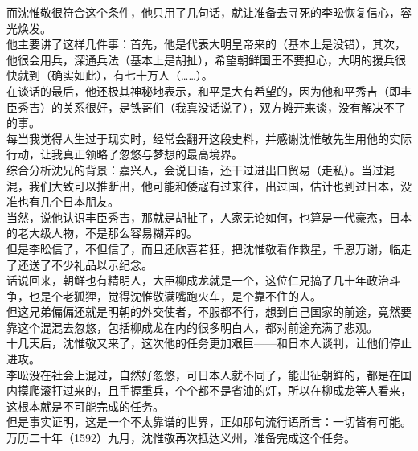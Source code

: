 \begin{multicols}{\theparacolNo}
而沈惟敬很符合这个条件，他只用了几句话，就让准备去寻死的李昖恢复信心，容光焕发。\\

他主要讲了这样几件事：首先，他是代表大明皇帝来的（基本上是没错），其次，他很会用兵，深通兵法（基本上是胡扯），希望朝鲜国王不要担心，大明的援兵很快就到（确实如此），有七十万人（……）。\\

在谈话的最后，他还极其神秘地表示，和平是大有希望的，因为他和平秀吉（即丰臣秀吉）的关系很好，是铁哥们（我真没话说了），双方摊开来谈，没有解决不了的事。\\

每当我觉得人生过于现实时，经常会翻开这段史料，并感谢沈惟敬先生用他的实际行动，让我真正领略了忽悠与梦想的最高境界。\\

综合分析沈兄的背景：嘉兴人，会说日语，还干过进出口贸易（走私）。当过混混，我们大致可以推断出，他可能和倭寇有过来往，出过国，估计也到过日本，没准也有几个日本朋友。\\

当然，说他认识丰臣秀吉，那就是胡扯了，人家无论如何，也算是一代豪杰，日本的老大级人物，不是那么容易糊弄的。\\

但是李昖信了，不但信了，而且还欣喜若狂，把沈惟敬看作救星，千恩万谢，临走了还送了不少礼品以示纪念。\\

话说回来，朝鲜也有精明人，大臣柳成龙就是一个，这位仁兄搞了几十年政治斗争，也是个老狐狸，觉得沈惟敬满嘴跑火车，是个靠不住的人。\\

但这兄弟偏偏还就是明朝的外交使者，不服都不行，想到自己国家的前途，竟然要靠这个混混去忽悠，包括柳成龙在内的很多明白人，都对前途充满了悲观。\\

十几天后，沈惟敬又来了，这次他的任务更加艰巨——和日本人谈判，让他们停止进攻。\\

李昖没在社会上混过，自然好忽悠，可日本人就不同了，能出征朝鲜的，都是在国内摸爬滚打过来的，且手握重兵，个个都不是省油的灯，所以在柳成龙等人看来，这根本就是不可能完成的任务。\\

但是事实证明，这是一个不太靠谱的世界，正如那句流行语所言：一切皆有可能。\\

万历二十年（1592）九月，沈惟敬再次抵达义州，准备完成这个任务。\\


\end{multicols}

